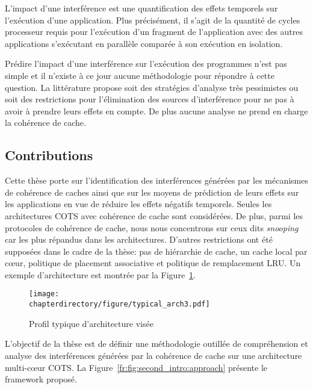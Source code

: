 \begin{definition}
\label{fr:sec:impact_of_interference}
L'impact d'une interférence est une quantification des effets temporels sur l'exécution d'une application. Plus précisément, il s'agit de
la quantité de cycles processeur requis pour l'exécution d'un fragment de
l'application avec des autres applications s'exécutant en parallèle
comparée à son exécution en isolation.
\end{definition}

Prédire l'impact d'une interférence sur l'exécution des programmes
n'est pas simple et il n'existe à ce jour aucune méthodologie pour répondre à cette question.
La littérature propose soit des stratégies d'analyse très pessimistes ou
soit des restrictions pour l'élimination des sources d'interférence
pour ne pas à avoir à prendre leurs effets en compte.
De plus aucune analyse ne prend en charge la cohérence de cache.


\subsection{Contributions}
Cette thèse porte sur l'identification des interférences générées par les
mécanismes de cohérence de caches ainsi que sur les moyens de prédiction de
leurs effets sur les applications en vue de réduire les effets négatifs temporels.
Seules les architectures COTS avec cohérence de cache sont considérées.
De plus, parmi les protocoles de cohérence de cache,
nous nous concentrons sur ceux dits \emph{snooping} car les plus répandus dans les architectures.
D'autres restrictions ont été supposées dans le cadre de la thèse: pas de hiérarchie de cache, un cache local par c\oe ur, politique de placement associative et politique de remplacement LRU.
Un exemple d'architecture est montrée par la
Figure~\ref{fr:fig:second_intro:typical_arch}.

\begin{figure}[hbt]
\begin{center}
\texttt{[image: \\chapterdirectory/figure/typical\_arch3.pdf]}
\end{center}
\caption{Profil typique d'architecture visée}
\label{fr:fig:second_intro:typical_arch}
\end{figure}

L'objectif de la thèse est de définir une méthodologie outillée
de compréhension et analyse des 
interférences générées par la cohérence de cache sur
une architecture
multi-c\oe{}ur COTS.
La Figure~\ref{fr:fig:second_intro:approach} présente le framework
proposé.


